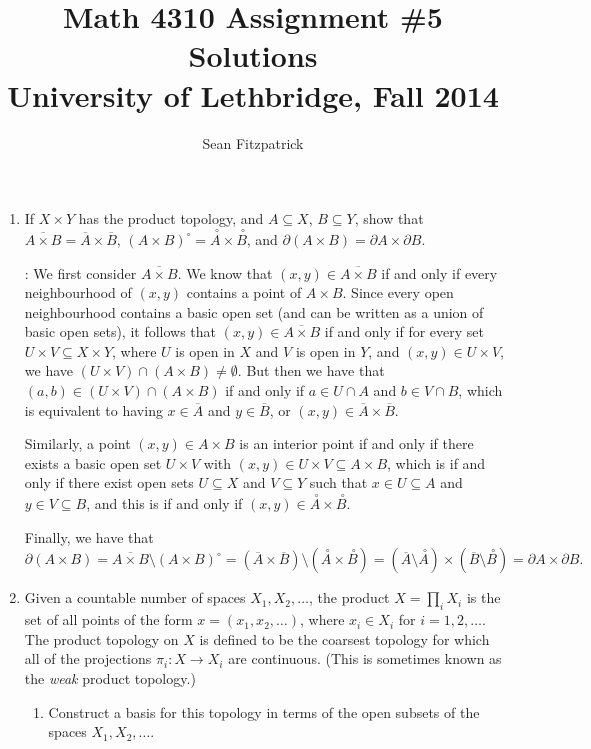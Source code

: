 \documentclass[letterpaper,12pt]{article}
\title{Math 4310 Assignment \#5 Solutions\\University of Lethbridge, Fall 2014}
\author{Sean Fitzpatrick}
\newcommand{\inter}[1]{\overset{\,\,\circ}{#1}}
\begin{document}
 \maketitle

\begin{enumerate}
\item If $X\times Y$ has the product topology, and $A\subseteq X$, $B\subseteq Y$, show that $\overline{A\times B} = \overline{A}\times \overline{B}$, $(A\times B)^\circ = \inter{A}\times\inter{B}$, and $\partial (A\times B) = \partial A\times \partial B$.

\bigskip

: We first consider $\overline{A\times B}$. We know that $(x,y)\in \overline{A\times B}$ if and only if every neighbourhood of $(x,y)$ contains a point of $A\times B$. Since every open neighbourhood contains a basic open set (and can be written as a union of basic open sets), it follows that $(x,y)\in\overline{A\times B}$ if and only if for every set $U\times V\subseteq X\times Y$, where $U$ is open in $X$ and $V$ is open in $Y$, and $(x,y)\in U\times V$, we have $(U\times V)\cap (A\times B)\neq \emptyset$. But then we have that $(a,b)\in (U\times V)\cap (A\times B)$ if and only if $a\in U\cap A$ and $b\in V\cap B$, which is equivalent to having $x\in\overline{A}$ and $y\in\overline{B}$, or $(x,y)\in \overline{A}\times \overline{B}$.

Similarly, a point $(x,y)\in A\times B$ is an interior point if and only if there exists a basic open set $U\times V$ with $(x,y)\in U\times V\subseteq A\times B$, which is if and only if there exist open sets $U\subseteq X$ and $V\subseteq Y$ such that $x\in U\subseteq A$ and $y\in V\subseteq B$, and this is if and only if $(x,y)\in \inter{A}\times\inter{B}$.

Finally, we have that 
\[
\partial(A\times B) = \overline{A\times B}\setminus (A\times B)^\circ = (\overline{A}\times \overline{B})\setminus (\inter{A}\times \inter{B}) = (\overline{A}\setminus \inter{A})\times (\overline{B}\setminus \inter{B}) = \partial A\times \partial B.
\]



\item Given a countable number of spaces $X_1,X_2,\ldots$, the product $X=\prod_i X_i$ is the set of all points of the form $x=(x_1,x_2,\ldots)$, where $x_i\in X_i$ for $i=1,2,\ldots$. The product topology on $X$ is defined to be the coarsest topology for which all of the projections $\pi_i:X\to X_i$ are continuous. (This is sometimes known as the {\em weak} product topology.)
\begin{enumerate}
 \item Construct a basis for this topology in terms of the open subsets of the spaces $X_1,X_2,\ldots$.


\end{enumerate}
\end{enumerate}
\end{document}
